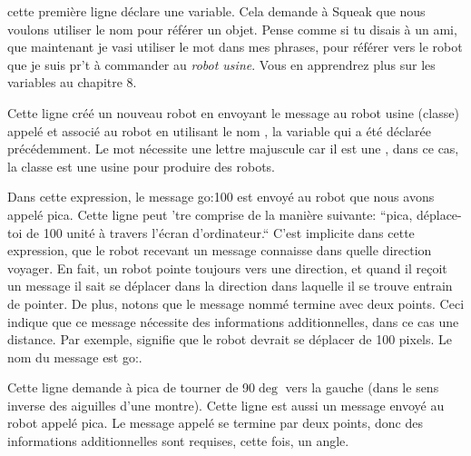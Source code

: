 \documentclass[a4paper,10pt,twoside]{book}
\begin{document}
\begin{description}
\item {} cette premi\`ere ligne d\'eclare une variable. Cela demande \`a Squeak que nous voulons utiliser le nom  pour r\'ef\'erer un objet. Pense comme si tu disais \`a un ami, que maintenant je vasi utiliser le mot  dans mes phrases, pour r\'ef\'erer vers le robot que je suis pr't \`a commander au \emph{robot usine}. Vous en apprendrez plus sur les variables au chapitre 8.

\item {} Cette ligne cr\'e\'e un nouveau robot en envoyant le message  au robot usine (classe) appel\'e  et associ\'e au robot en utilisant le nom , la variable qui a \'et\'e d\'eclar\'ee pr\'ec\'edemment. Le mot  n\'ecessite une lettre majuscule  car il est une , dans ce cas, la classe est une usine pour produire des robots.

\item {} Dans cette expression, le message go:100 est envoy\'e au robot que nous avons appel\'e pica. Cette ligne peut 'tre comprise de la mani\`ere suivante: ``pica, d\'eplace-toi de 100 unit\'e \`a travers l'\'ecran d'ordinateur.`` C'est implicite dans cette expression, que le robot recevant un message  connaisse dans quelle direction voyager. En fait, un robot pointe toujours vers une direction, et quand il re\c coit un message  il sait se d\'eplacer dans la direction dans laquelle il se trouve entrain de pointer. De plus, notons que le message nomm\'e  termine avec  deux points. Ceci indique que ce message n\'ecessite des informations additionnelles, dans ce cas une  distance. Par exemple,  signifie que le robot devrait se d\'eplacer de 100 pixels. Le nom du message est go:.

\item {} Cette ligne demande \`a pica de tourner de 90$\deg$ vers la gauche (dans le sens inverse des aiguilles d'une montre). Cette ligne est aussi un message envoy\'e au robot appel\'e pica. Le message appel\'e  se termine par deux points, donc des informations additionnelles sont requises, cette fois, un angle.

\end{description}

\end{document}
